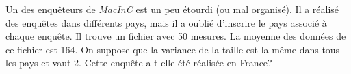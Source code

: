 \documentclass[12pt,paper=a4,answers]{exam}
\begin{document}
\begin{questions}
     




 	\question Un des enqu\^eteurs de \textit{MacInC} est un peu \'etourdi (ou mal organis\'e). Il a r\'ealis\'e des enqu\^etes dans diff\'erents pays, mais il a oubli\'e d'inscrire le pays associ\'e \`a chaque enqu\^ete. Il trouve un fichier avec 50 mesures. La moyenne des donn\'ees de ce fichier est 164. On suppose que la variance de la taille est la m\^eme dans tous les pays et vaut 2. Cette enqu\^ete a-t-elle \'et\'e r\'ealis\'ee en France? 
 	      
   \end{questions}
   
\end{document}
